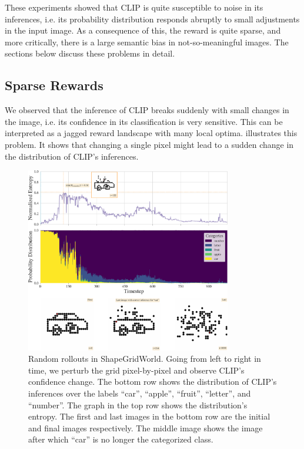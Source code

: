 These experiments showed that CLIP is quite susceptible to noise in its inferences, i.e. its probability distribution responds abruptly to small adjustments in the input image.
As a consequence of this, the reward is quite sparse, and more critically, there is a large semantic bias in not-so-meaningful images.
The sections below discuss these problems in detail.

\subsection{Sparse Rewards} %
\label{sec:sparse-rewards}

We observed that the inference of CLIP breaks suddenly with small changes in the image, i.e. its confidence in its classification is very sensitive.
This can be interpreted as a jagged reward landscape with many local optima.
 illustrates this problem.
It shows that changing a single pixel might lead to a sudden change in the distribution of CLIP's inferences.

\begin{figure}[h]
    \centering
    \includegraphics[width=0.8\textwidth]{images/sparse_rewards.pdf}
    \caption[Random rollouts in ShapeGridWorld.]{Random rollouts in ShapeGridWorld. Going from left to right in time, we perturb the grid pixel-by-pixel and observe CLIP's confidence change. The bottom row shows the distribution of CLIP's inferences over the labels ``car'', ``apple'', ``fruit'', ``letter'', and ``number''. The graph in the top row shows the distribution's entropy. The first and last images in the bottom row are the initial and final images respectively.
    The middle image shows the image after which ``car'' is no longer the categorized class.}
    \label{fig:sparse-rewards}
    
\end{figure}

